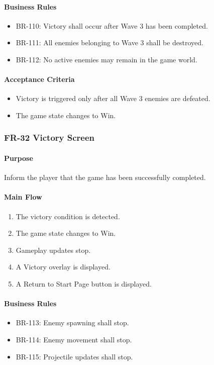 \documentclass[11pt,a4paper]{article}
\begin{document}
\paragraph{Business Rules}
\begin{itemize}
  \item BR-110: Victory shall occur after Wave 3 has been completed.
  \item BR-111: All enemies belonging to Wave 3 shall be destroyed.
  \item BR-112: No active enemies may remain in the game world.
\end{itemize}

\paragraph{Acceptance Criteria}
\begin{itemize}
  \item Victory is triggered only after all Wave 3 enemies are defeated.
  \item The game state changes to Win.
\end{itemize}

\subsubsection{FR-32 Victory Screen}

\paragraph{Purpose}
Inform the player that the game has been successfully completed.

\paragraph{Main Flow}
\begin{enumerate}
  \item The victory condition is detected.
  \item The game state changes to Win.
  \item Gameplay updates stop.
  \item A Victory overlay is displayed.
  \item A Return to Start Page button is displayed.
\end{enumerate}

\paragraph{Business Rules}
\begin{itemize}
  \item BR-113: Enemy spawning shall stop.
  \item BR-114: Enemy movement shall stop.
  \item BR-115: Projectile updates shall stop.
\end{itemize}
\end{document}
